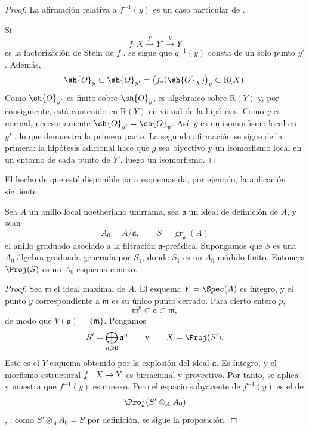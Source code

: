 \documentclass[oneside]{amsart}
\makeatletter
\renewcommand{\geq}{\geqslant}
\newcommand{\ega@arrow}[2]{\mathchoice{#1}{#2}{#2}{#2}}
\renewcommand{\to}{\ega@arrow{\longrightarrow}{\rightarrow}}
\newcommand{\oldpage}[2][]{{\marginnote{\normalfont\textbf{#1}~|~#2}}\ignorespaces}
\let\EGAOriginalLabel\label
\renewcommand{\label}[1]{\phantomsection\EGAOriginalLabel{#1}}
\makeatother
\begin{document}
\begin{proof}
La afirmación relativa a $f^{-1}(y)$ es un caso particular de
.

\oldpage[III]{135}

Si
\[
  f:X\xrightarrow{f'}Y'\xrightarrow{g}Y
\]
es la factorización de Stein de $f$ , se sigue que
$g^{-1}(y)$ consta de un solo punto $y'$. Además,
\[
  \sh{O}_y
  \subset
  \sh{O}_{y'}
  =
  \bigl(f_*(\sh{O}_X)\bigr)_y
  \subset
  \mathrm{R}(X).
\]
Como $\sh{O}_{y'}$ es finito sobre $\sh{O}_y$, es algebraico sobre $\mathrm{R}(Y)$ y, por consiguiente, está contenido en $\mathrm{R}(Y)$ en virtud de la hipótesis. Como $y$ es normal, necesariamente
$\sh{O}_{y'}=\sh{O}_y$. Así, $g$ es un isomorfismo local en $y'$
, lo que demuestra la primera parte. La segunda
afirmación se sigue de la primera: la hipótesis adicional hace que $g$
sea biyectivo y un isomorfismo local en un entorno de cada punto de
$Y'$, luego un isomorfismo.
\end{proof}

El hecho de que  esté disponible para esquemas da, por
ejemplo, la aplicación siguiente.

\begin{proposition}[4.3.13]
\label{III.4.3.13}
Sea $A$ un anillo local noetheriano unirrama, sea $\mathfrak{a}$ un
ideal de definición de $A$, y sean
\[
  A_0=A/\mathfrak{a},
  \qquad
  S=\operatorname{gr}_{\mathfrak{a}}(A)
\]
el anillo graduado asociado a la filtración $\mathfrak{a}$-preádica.
Supongamos que $S$ es una $A_0$-álgebra graduada generada por $S_1$,
donde $S_1$ es un $A_0$-módulo finito. Entonces $\Proj(S)$ es un
$A_0$-esquema conexo.
\end{proposition}

\begin{proof}
Sea $\mathfrak{m}$ el ideal maximal de $A$. El esquema
$Y=\Spec(A)$ es íntegro, y el punto $y$ correspondiente a
$\mathfrak{m}$ es su único punto cerrado. Para cierto entero $p$,
\[
  \mathfrak{m}^p\subset\mathfrak{a}\subset\mathfrak{m},
\]
de modo que $V(\mathfrak{a})=\{\mathfrak{m}\}$. Pongamos
\[
  S'=\bigoplus_{n\geq0}\mathfrak{a}^n
  \qquad\text{y}\qquad
  X=\Proj(S').
\]
Este es el $Y$-esquema obtenido por la explosión del ideal
$\mathfrak{a}$. Es íntegro, y el morfismo estructural
$f:X\to Y$ es birracional  y proyectivo.
Por tanto,  se aplica y muestra que $f^{-1}(y)$ es
conexo. Pero el espacio subyacente de $f^{-1}(y)$ es el de
\[
  \Proj(S'\otimes_A A_0)
\]
, ; como
$S'\otimes_AA_0=S$ por definición, se sigue la proposición.
\end{proof}
\end{document}
